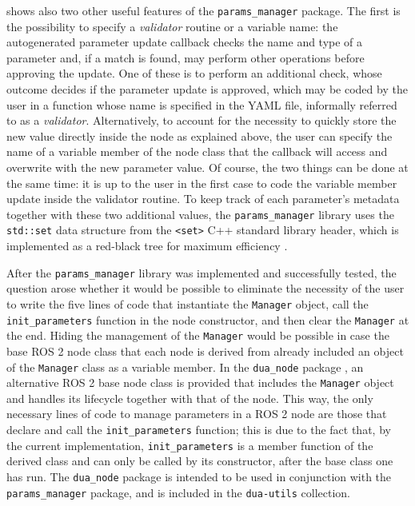 shows also two other useful features of the \texttt{params\_manager} package. The first is the possibility to specify a \emph{validator} routine or a variable name: the autogenerated parameter update callback checks the name and type of a parameter and, if a match is found, may perform other operations before approving the update. One of these is to perform an additional check, whose outcome decides if the parameter update is approved, which may be coded by the user in a function whose name is specified in the YAML file, informally referred to as a \emph{validator}. Alternatively, to account for the necessity to quickly store the new value directly inside the node as explained above, the user can specify the name of a variable member of the node class that the callback will access and overwrite with the new parameter value. Of course, the two things can be done at the same time: it is up to the user in the first case to code the variable member update inside the validator routine. To keep track of each parameter's metadata together with these two additional values, the \texttt{params\_manager} library uses the \texttt{std::set} data structure from the \texttt{<set>} C++ standard library header, which is implemented as a red-black tree for maximum efficiency \cite{guibas_dichromatic_1978}.

After the \texttt{params\_manager} library was implemented and successfully tested, the question arose whether it would be possible to eliminate the necessity of the user to write the five lines of code that instantiate the \texttt{Manager} object, call the \texttt{init\_parameters} function in the node constructor, and then clear the \texttt{Manager} at the end. Hiding the management of the \texttt{Manager} would be possible in case the base ROS 2 node class that each node is derived from already included an object of the \texttt{Manager} class as a variable member. In the \texttt{dua\_node} package \cite{masocco_dua_node_nodate}, an alternative ROS 2 base node class is provided that includes the \texttt{Manager} object and handles its lifecycle together with that of the node. This way, the only necessary lines of code to manage parameters in a ROS 2 node are those that declare and call the \texttt{init\_parameters} function; this is due to the fact that, by the current implementation, \texttt{init\_parameters} is a member function of the derived class and can only be called by its constructor, after the base class one has run. The \texttt{dua\_node} package is intended to be used in conjunction with the \texttt{params\_manager} package, and is included in the \texttt{dua-utils} collection.

